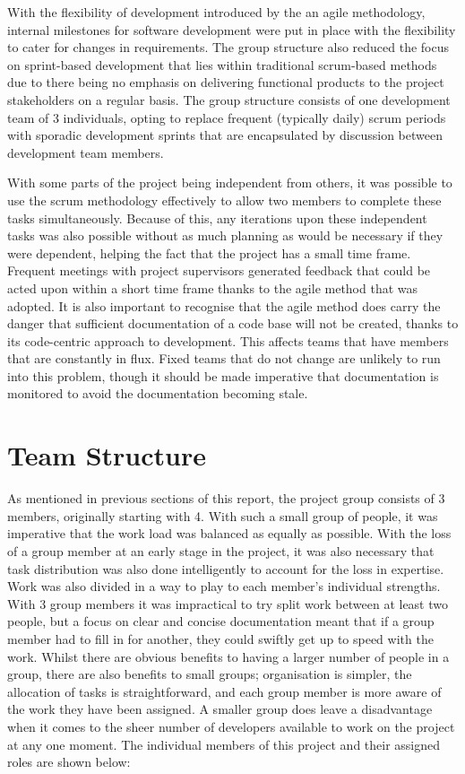         With the flexibility of development introduced by the an agile methodology, internal milestones for software development were put in place with the flexibility to cater for changes in requirements. The group structure also reduced the focus on sprint-based development that lies within traditional scrum-based methods due to there being no emphasis on delivering functional products to the project stakeholders on a regular basis. The group structure consists of one development team of 3 individuals, opting to replace frequent (typically daily) scrum periods with sporadic development sprints that are encapsulated by discussion between development team members.
        
        With some parts of the project being independent from others, it was possible to use the scrum methodology effectively to allow two members to complete these tasks simultaneously. Because of this, any iterations upon these independent tasks was also possible without as much planning as would be necessary if they were dependent, helping the fact that the project has a small time frame. Frequent meetings with project supervisors generated feedback that could be acted upon within a short time frame thanks to the agile method that was adopted. It is also important to recognise that the agile method does carry the danger that sufficient documentation of a code base will not be created, thanks to its code-centric approach to development. This affects teams that have members that are constantly in flux. Fixed teams that do not change are unlikely to run into this problem, though it should be made imperative that documentation is monitored to avoid the documentation becoming stale.
        
\section{Team Structure}

    As mentioned in previous sections of this report, the project group consists of 3 members, originally starting with 4. With such a small group of people, it was imperative that the work load was balanced as equally as possible. With the loss of a group member at an early stage in the project, it was also necessary that task distribution was also done intelligently to account for the loss in expertise. Work was also divided in a way to play to each member's individual strengths. With 3 group members it was impractical to try split work between at least two people, but a focus on clear and concise documentation meant that if a group member had to fill in for another, they could swiftly get up to speed with the work. Whilst there are obvious benefits to having a larger number of people in a group, there are also benefits to small groups; organisation is simpler, the allocation of tasks is straightforward, and each group member is more aware of the work they have been assigned. A smaller group does leave a disadvantage when it comes to the sheer number of developers available to work on the project at any one moment. The individual members of this project and their assigned roles are shown below:
    
